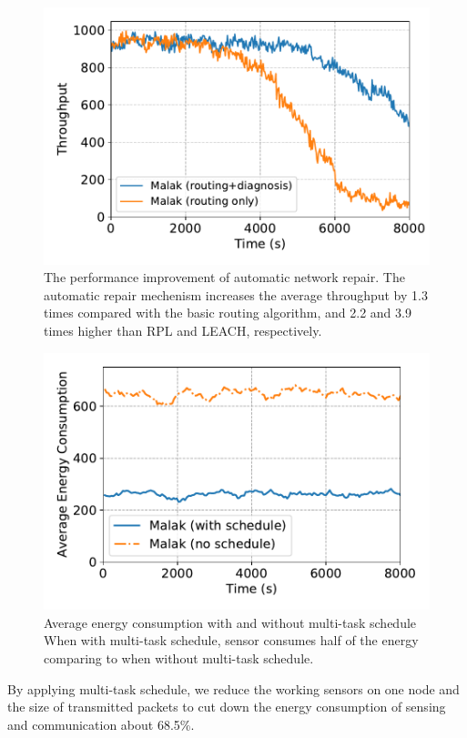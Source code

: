 \begin{figure}[!h]
	\centering
	\includegraphics[width=.95\columnwidth]{Figure/diagnosis}
	\vspace{-0.1in}
	\caption{The performance improvement of automatic network repair.
		\textnormal{
			The automatic repair mechenism increases the average throughput by
			1.3 times compared with the basic {\sdn} routing algorithm, and
			2.2 and 3.9 times higher than RPL and LEACH, respectively.
		}}
	\label{fig:diagnosis}
\end{figure}

\begin{figure}[!h]
	\centering
	\includegraphics[width=.95\columnwidth]{Figure/multitask_energy}
	\vspace{-0.1in}
	\caption{Average energy consumption with and without multi-task schedule
		\textnormal{When with multi-task schedule, sensor consumes half of the energy
			comparing to when without multi-task schedule.}}
	\label{fig:multitask_energy}
\end{figure}

By applying multi-task schedule, we reduce the working sensors on one node and
the size of transmitted packets to cut down the energy consumption of sensing
and communication about 68.5\%.

